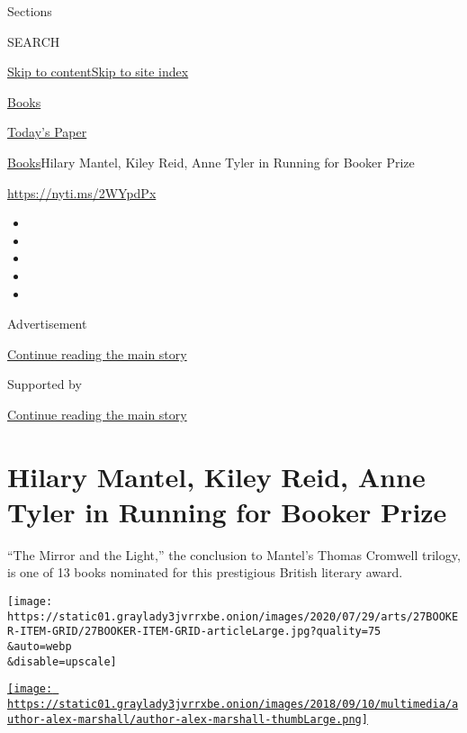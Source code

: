 Sections

SEARCH

\protect\hyperlink{site-content}{Skip to
content}\protect\hyperlink{site-index}{Skip to site index}

\href{https://www.nytimes3xbfgragh.onion/section/books}{Books}

\href{https://myaccount.nytimes3xbfgragh.onion/auth/login?response_type=cookie\&client_id=vi}{}

\href{https://www.nytimes3xbfgragh.onion/section/todayspaper}{Today's
Paper}

\href{/section/books}{Books}\textbar{}Hilary Mantel, Kiley Reid, Anne
Tyler in Running for Booker Prize

\href{https://nyti.ms/2WYpdPx}{https://nyti.ms/2WYpdPx}

\begin{itemize}
\item
\item
\item
\item
\item
\end{itemize}

Advertisement

\protect\hyperlink{after-top}{Continue reading the main story}

Supported by

\protect\hyperlink{after-sponsor}{Continue reading the main story}

\hypertarget{hilary-mantel-kiley-reid-anne-tyler-in-running-for-booker-prize}{%
\section{Hilary Mantel, Kiley Reid, Anne Tyler in Running for Booker
Prize}\label{hilary-mantel-kiley-reid-anne-tyler-in-running-for-booker-prize}}

``The Mirror and the Light,'' the conclusion to Mantel's Thomas Cromwell
trilogy, is one of 13 books nominated for this prestigious British
literary award.

\texttt{[image: https://static01.graylady3jvrrxbe.onion/images/2020/07/29/arts/27BOOKER-ITEM-GRID/27BOOKER-ITEM-GRID-articleLarge.jpg?quality=75\\\&auto=webp\\\&disable=upscale]}

\href{https://www.nytimes3xbfgragh.onion/by/alex-marshall}{\texttt{[image: https://static01.graylady3jvrrxbe.onion/images/2018/09/10/multimedia/author-alex-marshall/author-alex-marshall-thumbLarge.png]}}

